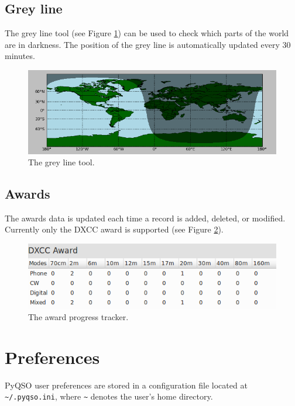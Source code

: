 \documentclass[11pt, a4paper]{report}
\begin{document}
\section{Grey line}
The grey line tool (see Figure \ref{fig:grey_line}) can be used to check which parts of the world are in darkness. The position of the grey line is automatically updated every 30 minutes.

\begin{figure}
  \centering
  \includegraphics[width=1\columnwidth]{images/grey_line.png}
  \caption{The grey line tool.}
  \label{fig:grey_line}
\end{figure}

\section{Awards}
The awards data is updated each time a record is added, deleted, or modified. Currently only the DXCC award is supported (see Figure \ref{fig:awards}).

\begin{figure}
  \centering
  \includegraphics[width=1\columnwidth]{images/awards.png}
  \caption{The award progress tracker.}
  \label{fig:awards}
\end{figure}

\chapter{Preferences}\label{chap:preferences}
PyQSO user preferences are stored in a configuration file located at \texttt{\textasciitilde/.pyqso.ini}, where \texttt{\textasciitilde} denotes the user's home directory.
\end{document}
